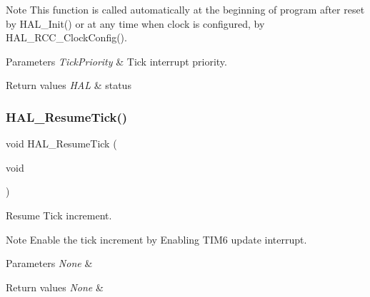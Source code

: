 \begin{DoxyNote}{Note}
This function is called automatically at the beginning of program after reset by H\+A\+L\+\_\+\+Init() or at any time when clock is configured, by H\+A\+L\+\_\+\+R\+C\+C\+\_\+\+Clock\+Config(). 
\end{DoxyNote}

\begin{DoxyParams}{Parameters}
{\em Tick\+Priority} & Tick interrupt priority. \\
\hline
\end{DoxyParams}

\begin{DoxyRetVals}{Return values}
{\em H\+AL} & status \\
\hline
\end{DoxyRetVals}
\mbox{\label{group___h_a_l___time_base___t_i_m_ga24e0ee9dae1ec0f9d19200f5575ff790}} 
\subsubsection{\texorpdfstring{H\+A\+L\+\_\+\+Resume\+Tick()}{HAL\_ResumeTick()}}
{\footnotesize\ttfamily void H\+A\+L\+\_\+\+Resume\+Tick (\begin{DoxyParamCaption}\item[{void}]{ }\end{DoxyParamCaption})}



Resume Tick increment. 

\begin{DoxyNote}{Note}
Enable the tick increment by Enabling T\+I\+M6 update interrupt. 
\end{DoxyNote}

\begin{DoxyParams}{Parameters}
{\em None} & \\
\hline
\end{DoxyParams}

\begin{DoxyRetVals}{Return values}
{\em None} & \\
\hline
\end{DoxyRetVals}
\mbox{\label{group___h_a_l___time_base___t_i_m_gaaf651af2afe688a991c657f64f8fa5f9}} 
